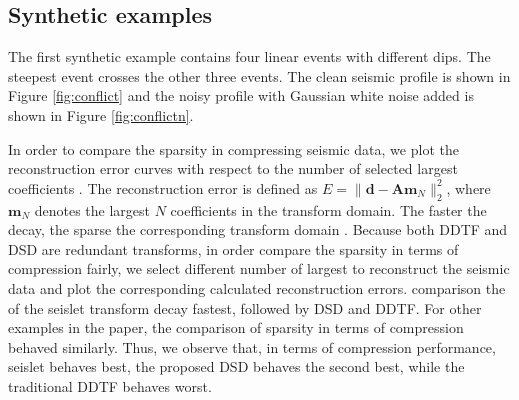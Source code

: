 \subsection{Synthetic examples}
The first synthetic example contains four linear events with different dips. The steepest event crosses the other three events.  The clean seismic profile is shown in Figure \ref{fig:conflict} and the noisy profile with Gaussian white noise added is shown in Figure \ref{fig:conflictn}.

In order to compare the sparsity in compressing seismic data, we plot the reconstruction error curves with respect to the number of selected largest coefficients . The reconstruction error is defined as $E=\parallel\mathbf{d}-\mathbf{Am}_N\parallel_2^2$, where $\mathbf{m}_N$ denotes the largest $N$ coefficients in the transform domain. The faster the  decay, the sparse the corresponding transform domain  . Because both DDTF and DSD are redundant transforms, in order  compare the sparsity in terms of compression fairly, we select  different number of largest  to reconstruct the seismic data and plot the corresponding calculated reconstruction errors.   comparison  the  of the seislet transform decay fastest, followed by DSD and DDTF. For other examples in the paper, the comparison of sparsity in terms of compression behaved similarly.  Thus, we observe that, in terms of compression performance,  seislet  behaves best, the proposed DSD behaves the second best, while the traditional DDTF behaves worst. 


